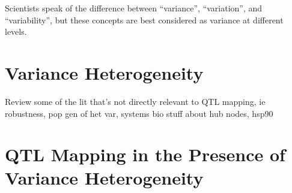 Scientists speak of the difference between ``variance'', ``variation'', and ``variability'', but these concepts are best considered as variance at different levels.

\section{Variance Heterogeneity}


Review some of the lit that's not directly relevant to QTL mapping,
ie robustness, pop gen of het var, systems bio stuff about hub  nodes, hsp90







\section{QTL Mapping in the Presence of Variance Heterogeneity}


